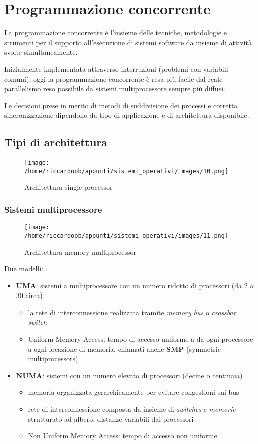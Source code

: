 \chapter{Programmazione concorrente}

La programmazione concorrente è l'insieme delle tecniche, metodologie e strumenti per il supporto all'esecuzione di sistemi software da insieme di attività svolte simultaneamente.

Inizialmente implementata attraverso interruzioni (problemi con variabili comuni), oggi la programmazione concorrente è resa più facile dal reale parallelismo reso possibile da sistemi multiprocessore sempre più diffusi.

Le decisioni prese in merito di metodi di suddivisione dei processi e corretta sincronizzazione dipendono da tipo di applicazione e di architettura disponibile.

\section{Tipi di architettura}
\begin{figure}[H]
    \caption{Architettura single processor}
    \centering
    \texttt{[image: /home/riccardoob/appunti/sistemi\_operativi/images/10.png]}
\end{figure}

\subsection{Sistemi multiprocessore}
\begin{figure}[H]
    \caption{Architettura memory multiprocessor}
    \centering
    \texttt{[image: /home/riccardoob/appunti/sistemi\_operativi/images/11.png]}
\end{figure}

Due modelli:
\begin{itemize}
    \item \textbf{UMA}: sistemi a multiprocessore con un numero ridotto di processori (da 2 a 30 circa)
    \begin{itemize}
        \item la rete di interconnessione realizzata tramite \textit{memory bus} o \textit{crossbar switch}
        \item Uniform Memory Access: tempo di accesso uniforme a da ogni processore a ogni locazione di memoria, chiamati anche \textbf{SMP} (symmetric multiprocessors).
    \end{itemize}
    \item \textbf{NUMA}: sistemi con un numero elevato di processori (decine o centinaia)
    \begin{itemize}
        \item memoria organizzata gerarchicamente per evitare congestioni sui bus
        \item rete di interconnessione composta da insieme di \textit{switches} e \textit{memorie} strutturato ad albero, distanze variabili dai processori
        \item Non Uniform Memory Access: tempo di accesso non uniforme
    \end{itemize}
\end{itemize}

